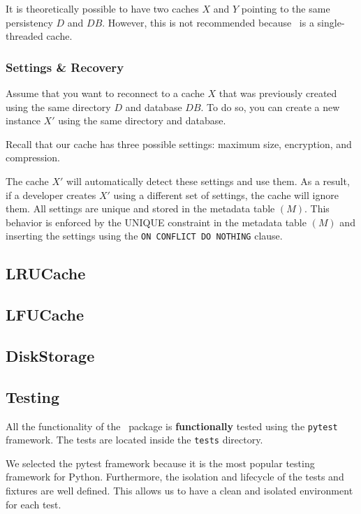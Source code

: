 \documentclass[11pt, journal]{IEEEtran}
\begin{document}
\begin{tcolorbox}[colback=blue!5!white, colframe=blue!75!black, title=Note]
    It is theoretically possible to have two caches $X$ and $Y$ pointing
    to the same persistency $D$ and $DB$. However, this is not recommended
    because \sqlitecache~is a single-threaded cache.
\end{tcolorbox}

\subsubsection{Settings \& Recovery}
Assume that you want to reconnect to a cache $X$ that was previously
created using the same directory $D$ and database $DB$. To do so, you can
create a new instance $X'$ using the same directory and database.

Recall that our cache has three possible settings: maximum size, encryption, and compression.

The cache $X'$ will automatically detect these settings and use them. As a result,
if a developer creates $X'$ using a different set of settings, the cache will
ignore them. All settings are unique and stored
in the metadata table $(M)$. This behavior is enforced by the UNIQUE
constraint in the metadata table $(M)$ and inserting
the settings using the \texttt{ON CONFLICT DO NOTHING} clause.

\subsection{LRUCache\label{sec:lru}}
\subsection{LFUCache\label{sec:lfu}}

\subsection{DiskStorage}

\subsection{Testing}
All the functionality of the \sqlitecache~package is \textbf{functionally} tested using
the \texttt{pytest} framework. The tests are located inside the \texttt{tests} directory.

We selected the pytest framework because it is the most popular testing framework
for Python. Furthermore, the isolation and lifecycle of the tests and fixtures
are well defined. This allows us to have a clean and isolated environment
for each test.
\end{document}
